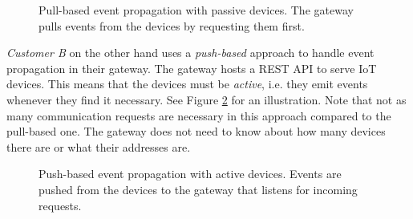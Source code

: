 \begin{figure}[h!]
    \centering
    \caption[Pull-based event propagation]{Pull-based event propagation with
    passive devices. The gateway pulls events from the devices by requesting
    them first.}
    \label{fig:pull-based}
\end{figure}

\textit{Customer B} on the other hand uses a \textit{push-based} approach to
handle event propagation in their gateway. The gateway hosts a REST API to
serve IoT devices. This means that the devices must be \textit{active}, i.e.
they emit events whenever they find it necessary. See Figure
\ref{fig:push-based} for an illustration. Note that not as many communication
requests are necessary in this approach compared to the pull-based one. The
gateway does not need to know about how many devices there are or what their
addresses are.

\begin{figure}[h!]
    \centering
    \caption[Push-based event propagation]{Push-based event propagation with
    active devices. Events are pushed from the devices to the gateway that
    listens for incoming requests.}
    \label{fig:push-based}
\end{figure}

